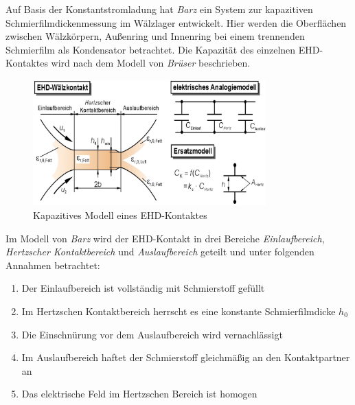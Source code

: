 Auf Basis der Konstantstromladung hat \textit{Barz} \cite{barz_1996} ein System zur kapazitiven Schmierfilmdickenmessung im Wälzlager entwickelt.
Hier werden die Oberflächen zwischen Wälzkörpern, Außenring und Innenring bei einem trennenden Schmierfilm als Kondensator betrachtet.
Die Kapazität des einzelnen EHD-Kontaktes wird nach dem Modell von \textit{Brüser} \cite{brueser_1972} beschrieben.
\begin{figure}[htb]
    \centering
    \includegraphics[width=0.8\textwidth]{./images/kapazitaet_schmierfilmdicke.png}
    \caption{Kapazitives Modell eines EHD-Kontaktes \cite{barz_1996}}
    \label{fig:kapazitives_modell_eines_ehd_kontaktes}
\end{figure}
%

Im Modell von \textit{Barz} wird der EHD-Kontakt in drei Bereiche \textit{Einlaufbereich}, \textit{Hertzscher Kontaktbereich} und \textit{Auslaufbereich} geteilt und unter folgenden Annahmen betrachtet:
%
\begin{enumerate}
    \item Der Einlaufbereich ist vollständig mit Schmierstoff gefüllt
    \item Im Hertzschen Kontaktbereich herrscht es eine konstante Schmierfilmdicke $h_0$
    \item Die Einschnürung vor dem Auslaufbereich wird vernachlässigt
    \item Im Auslaufbereich haftet der Schmierstoff gleichmäßig an den Kontaktpartner an
    \item Das elektrische Feld im Hertzschen Bereich ist homogen
\end{enumerate}
%

